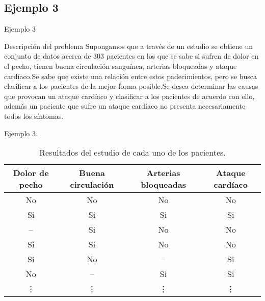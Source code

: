 \documentclass[11pt,aspectratio=169]{beamer}
\begin{document}
\subsection{Ejemplo 3}
\begin{frame}{Ejemplo 3}
	\begin{block}{Descripción del problema}
		Supongamos que a través de un estudio se obtiene un conjunto de datos acerca de 303 pacientes en los 
		que se sabe si sufren de dolor en el pecho, tienen buena circulación sanguínea, arterias bloqueadas 
		y ataque cardíaco.\pause Se sabe que existe una relación entre estos padecimientos, pero se busca 
		clasificar a los pacientes de la mejor forma posible.\pause Se desea determinar las causas que 
		provocan un ataque cardíaco y clasificar a los pacientes de acuerdo con ello, además un paciente que
		sufre un ataque cardíaco no presenta necesariamente todos los síntomas. \pause 
	\end{block}
\end{frame}

\begin{frame}{Ejemplo 3.}
	
	\begin{table}
		\centering
		\begin{tabular}{c|c|c|c}
			\toprule
			Dolor de pecho & Buena circulación & Arterias bloqueadas & Ataque cardíaco \\
			\midrule		
			No & No & No & No \\\midrule
			Si & Si & Si & Si \\\midrule
			-- & Si & No & No \\\midrule
			Si & Si & No & No \\\midrule
			Si & No & -- & Si \\\midrule
			No & -- & Si & Si \\\midrule
			\vdots & \vdots & \vdots & \vdots \\
			\bottomrule
		\end{tabular}
		\caption{Resultados del estudio de cada uno de los pacientes.}
		\label{tab:datosPacientes}
	\end{table}
\end{frame}
\end{document}
